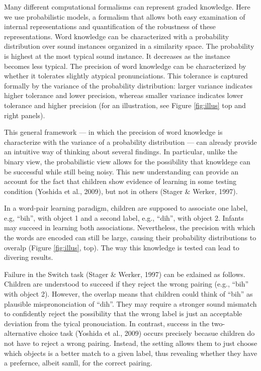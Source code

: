 \documentclass[english,,man,floatsintext]{apa6}
\theoremstyle{definition}
\theoremstyle{definition}
\theoremstyle{definition}
\theoremstyle{remark}
\begin{document}
Many different computational formalisms can represent graded knowledge.
Here we use probabilistic models, a formalism that allows both easy
examination of internal representations and quantification of the
robustness of these representations. Word knowledge can be characterized
with a probability distribution over sound instances organized in a
similarity space. The probability is highest at the most typical sound
instance. It decreases as the instance becomes less typical. The
precision of word knowledge can be characterized by whether it tolerates
slightly atypical pronunciations. This tolerance is captured formally by
the variance of the probability distribution: larger variance indicates
higher tolerance and lower precision, whereas smaller variance indicates
lower tolerance and higher precision (for an illustration, see Figure
\ref{fig:illus} top and right panels).

This general framework --- in which the precision of word knowledge is
characterize with the variance of a probability distribution --- can
already provide an intuitive way of thinking about several findings. In
particular, unlike the binary view, the probabilistic view allows for
the possibility that knowldege can be successful while still being
noisy. This new understanding can provide an account for the fact that
children show evidence of learning in some testing condition (Yoshida et
al., 2009), but not in others (Stager \& Werker, 1997).

In a word-pair learning paradigm, children are supposed to associate one
label, e.g, \enquote{bih}, with object 1 and a second label, e.g.,
\enquote{dih}, with object 2. Infants may succeed in learning both
associations. Nevertheless, the precision with which the words are
encoded can still be large, causing their probability distributions to
overalp (Figure \ref{fig:illus}, top). The way this knowledge is tested
can lead to divering results.

Failure in the Switch task (Stager \& Werker, 1997) can be exlained as
follows. Children are understood to succeed if they reject the wrong
pairing (e.g., \enquote{bih} with object 2). However, the overlap means
that children could think of \enquote{bih} as plausible misprononciation
of \enquote{dih}. They may require a stronger sound mismatch to
confidently reject the possibility that the wrong label is just an
acceptable deviation from the tyical pronouciation. In contrast, success
in the two-alternative choice task (Yoshida et al., 2009) occurs
precisely becasue children do not have to reject a wrong pairing.
Instead, the setting allows them to just choose which objects is a
better match to a given label, thus revealing whether they have a
prefernce, albeit samll, for the correct pairing.
\end{document}
